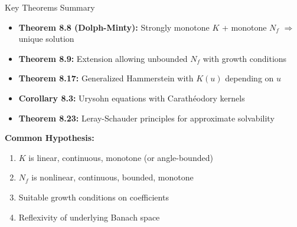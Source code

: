 \documentclass[aspectratio=169,10pt]{beamer}
\theoremstyle{plain}
\theoremstyle{definition}
\begin{document}
\begin{frame}{Key Theorems Summary}
  \vspace{0.3cm}
  \begin{itemize}
    \item \textbf{Theorem 8.8 (Dolph-Minty):} Strongly monotone $K$ + monotone $N_f$ $\Rightarrow$ unique solution

    \item \textbf{Theorem 8.9:} Extension allowing unbounded $N_f$ with growth conditions

    \item \textbf{Theorem 8.17:} Generalized Hammerstein with $K(u)$ depending on $u$

    \item \textbf{Corollary 8.3:} Urysohn equations with Carathéodory kernels

    \item \textbf{Theorem 8.23:} Leray-Schauder principles for approximate solvability
  \end{itemize}

  \vspace{0.3cm}
  \textbf{Common Hypothesis:}
  \begin{enumerate}
    \item $K$ is linear, continuous, monotone (or angle-bounded)
    \item $N_f$ is nonlinear, continuous, bounded, monotone
    \item Suitable growth conditions on coefficients
    \item Reflexivity of underlying Banach space
  \end{enumerate}
\end{frame}
\end{document}
